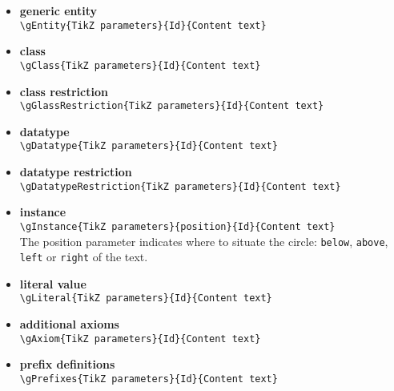 \documentclass[11pt,a4paper,final,oneside,onecolumn]{article}
\begin{document}
	\begin{itemize}
		\item \textbf{generic entity}\\ \verb|\gEntity{TikZ parameters}{Id}{Content text}|
		
		\item \textbf{class}\\ \verb|\gClass{TikZ parameters}{Id}{Content text}|	
		
		\item \textbf{class restriction}\\ \verb|\gGlassRestriction{TikZ parameters}{Id}{Content text}|
		
		\item \textbf{datatype}\\ \verb|\gDatatype{TikZ parameters}{Id}{Content text}|
		\item \textbf{datatype restriction}\\ \verb|\gDatatypeRestriction{TikZ parameters}{Id}{Content text}|
		
		\item \textbf{instance}\\ \verb|\gInstance{TikZ parameters}{position}{Id}{Content text}| \\ The position parameter indicates where to situate the circle: \texttt{below}, \texttt{above}, \texttt{left} or \texttt{right} of the text.
		
		\item \textbf{literal value}\\ \verb|\gLiteral{TikZ parameters}{Id}{Content text}|
		
		\item \textbf{additional axioms}\\ \verb|\gAxiom{TikZ parameters}{Id}{Content text}|
		
		\item \textbf{prefix definitions}\\ \verb|\gPrefixes{TikZ parameters}{Id}{Content text}|
	\end{itemize}
	
\end{document}
